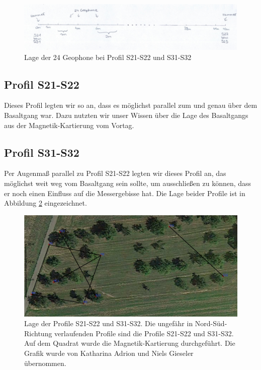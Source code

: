 \begin{figure}[!ht]
 \centering
 \includegraphics[width=\textwidth]{fig/Skizze2}
 \caption{Lage der 24 Geophone bei Profil S21-S22 und S31-S32}
 \label{fig:Lea2}
\end{figure}

\subsection{Profil S21-S22}

Dieses Profil legten wir so an, dass es möglichst parallel zum und genau über dem Basaltgang war. Dazu nutzten wir unser Wissen über die Lage des Basaltgangs aus der Magnetik-Kartierung vom Vortag.

\subsection{Profil S31-S32}

Per Augenmaß parallel zu Profil S21-S22 legten wir dieses Profil an, das möglichst weit weg vom Basaltgang sein sollte, um ausschließen zu können, dass er noch einen Einfluss auf die Messergebisse hat. Die Lage beider Profile ist in Abbildung \ref{fig:kleineProfile} eingezeichnet.

\begin{figure}[!ht]
 \centering
 \includegraphics[width=\textwidth]{fig/Seismik_klein_verbund}
 \caption[Lage der Profile S21-S22 und S31-S32]{Lage der Profile S21-S22 und S31-S32. Die ungefähr in Nord-Süd-Richtung verlaufenden Profile sind die Profile S21-S22 und S31-S32. Auf dem Quadrat wurde die Magnetik-Kartierung durchgeführt. Die Grafik wurde von Katharina Adrion und Niels Gieseler übernommen.}
 \label{fig:kleineProfile}
\end{figure}

